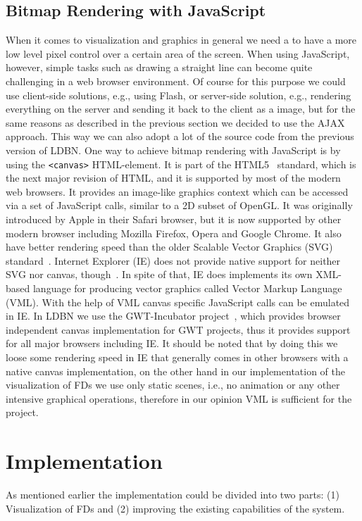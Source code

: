 \subsection{Bitmap Rendering with JavaScript}
\label{sec:renderingJS}
When it comes to visualization and graphics in general we need a 
to have a more low level pixel control over a certain area of the screen. 
When using JavaScript, however, simple tasks such as drawing a straight
line can become quite challenging in a web browser environment.
Of course for this purpose we could use client-side solutions, e.g., using Flash, or 
server-side solution, e.g., rendering everything on the server and sending it back
to the client as a image, but for the same reasons as described in the previous
section we decided to use the AJAX approach. This way we can also
adopt a lot of the source code from the previous version of LDBN. 
One way to achieve bitmap rendering with JavaScript is by
using the \verb=<canvas>= HTML-element. 
It is part of the HTML5~\cite{html5} standard, which is the next major revision of HTML, and it is supported by
most of the modern web browsers. It provides an image-like 
graphics context which can be accessed via a set of JavaScript calls, 
similar to a 2D subset of OpenGL. 
It was originally introduced by Apple in their Safari browser, but it is now 
supported by other modern browser including Mozilla Firefox, Opera and Google Chrome.
It also have  better rendering speed than the older Scalable Vector Graphics (SVG) standard~\cite{w8}. 
Internet Explorer (IE) does not 
provide native support for 
neither SVG nor canvas, though~\cite{w9}. In spite of that, IE does 
implements its own XML-based language for producing vector graphics 
called Vector Markup Language (VML). With the help of VML canvas specific JavaScript 
calls can be emulated in IE. In LDBN we use the GWT-Incubator project~\cite{gwtincubator}, which provides
browser independent canvas implementation for GWT projects, thus 
it provides support for all major browsers including IE. 
It should be noted that by doing this
we loose some rendering speed in IE that generally comes in other browsers
with a native canvas implementation, on the other hand in our implementation of the visualization of FDs we use only static scenes, i.e., 
no animation or any other intensive 
graphical operations, therefore in our opinion VML is sufficient 
for the project. 

\section{Implementation}
\label{sec:implementation}
As mentioned earlier the implementation could be divided into two parts: 
(1) Visualization of FDs and 
(2) improving the existing capabilities of the system.

